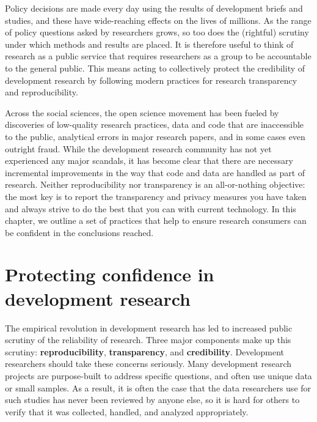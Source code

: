 
\begin{fullwidth}

	Policy decisions are made every day using the results of development briefs and studies,
	and these have wide-reaching effects on the lives of millions.
	As the range of policy questions asked by researchers grows,
	so too does the (rightful) scrutiny under which methods and results are placed.
	It is therefore useful to think of research as a public service
  that requires researchers as a group to be accountable to the general public.
	This means acting to collectively protect the credibility of development research
	by following modern practices for research transparency and reproducibility.

  Across the social sciences, the open science movement has been fueled
  by discoveries of low-quality research practices,
	data and code that are inaccessible to the public,
  analytical errors in major research papers,
	and in some cases even outright fraud.
  While the development research community has not yet
  experienced any major scandals,
  it has become clear that there are necessary incremental improvements
	in the way that code and data are handled as part of research.
	Neither reproducibility nor transparency is an all-or-nothing objective:
	the most key is to report the transparency and privacy measures you have taken
  and always strive to do the best that you can with current technology.
	In this chapter, we outline a set of practices that help to ensure
	research consumers can be confident in the conclusions reached.

\end{fullwidth}


\section{Protecting confidence in development research}

The empirical revolution in development research\cite{angrist2017economic}
has led to increased public scrutiny of the reliability of research.\cite{rogers_2017}
Three major components make up this scrutiny: \textbf{reproducibility}\cite{duvendack2017meant}, \textbf{transparency},\cite{christensen2018transparency} and \textbf{credibility}.\cite{ioannidis2017power}
Development researchers should take these concerns seriously.
Many development research projects are purpose-built to address specific questions,
and often use unique data or small samples.
As a result, it is often the case that the data
researchers use for such studies has never been reviewed by anyone else,
so it is hard for others to verify that it was
collected, handled, and analyzed appropriately.

